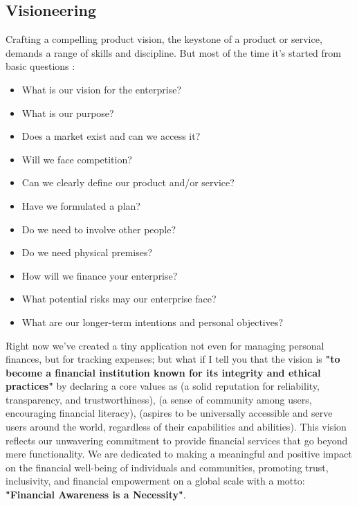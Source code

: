 
\subsection{Visioneering}

Crafting a compelling product vision, the keystone of a product or service, demands a range of skills and discipline.
But most of the time it's started from basic questions \cite{Barr13}:

\begin{itemize}
  \item What is our vision for the enterprise?
  \item What is our purpose?
  \item Does a market exist and can we access it?
  \item Will we face competition?
  \item Can we clearly define our product and/or service?
  \item Have we formulated a plan?
  \item Do we need to involve other people?
  \item Do we need physical premises?
  \item How will we finance your enterprise?
  \item What potential risks may our enterprise face?
  \item What are our longer-term intentions and personal objectives?
\end{itemize}

\noindent Right now we've created a tiny application not even for managing personal finances, but for tracking expenses; 
but what if I tell you that the vision is \textbf{"to become a financial institution known for its integrity and ethical 
practices"} by declaring a core values as  (a solid reputation for reliability, transparency, and 
trustworthiness),  (a sense of community among users, encouraging financial literacy), 
 (aspires to be universally accessible and serve users around the world, regardless of their 
capabilities and abilities). This vision reflects our unwavering commitment to provide financial services that go 
beyond mere functionality. We are dedicated to making a meaningful and positive impact on the financial well-being of
individuals and communities, promoting trust, inclusivity, and financial empowerment on a global scale with a motto: 
\textbf{"Financial Awareness is a Necessity"}.

